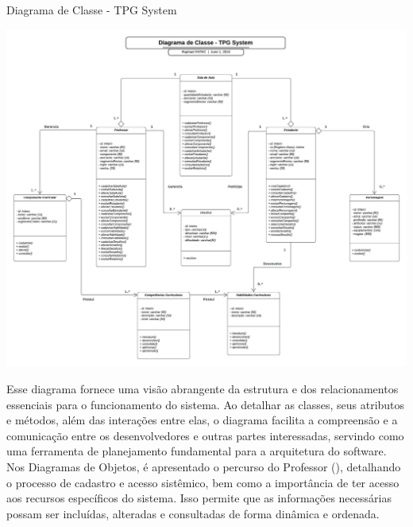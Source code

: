 \begin{flowchart}[!h]
\centering
\caption{Diagrama de Classe - TPG System}%
\label{fcht:imgdgC.jpg}
\includegraphics[scale=0.47]{Illustrations/imgdgC.jpg}
\end{flowchart}

Esse diagrama fornece uma visão abrangente da estrutura e dos relacionamentos essenciais para o funcionamento do sistema. Ao detalhar as classes, seus atributos e métodos, além das interações entre elas, o diagrama facilita a compreensão e a comunicação entre os desenvolvedores e outras partes interessadas, servindo como uma ferramenta de planejamento fundamental para a arquitetura do software.
\\

Nos Diagramas de Objetos, é apresentado o percurso do Professor (), detalhando o processo de cadastro e acesso sistêmico, bem como a importância de ter acesso aos recursos específicos do sistema. Isso permite que as informações necessárias possam ser incluídas, alteradas e consultadas de forma dinâmica e ordenada.
\\


